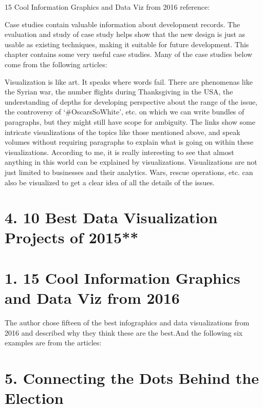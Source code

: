 \documentclass[]{book}
\theoremstyle{definition}
\theoremstyle{definition}
\theoremstyle{definition}
\theoremstyle{remark}
\begin{document}
15 Cool Information Graphics and Data Viz from 2016
reference:\citep{cool_data}

Case studies contain valuable information about development records. The
evaluation and study of case study helps show that the new design is
just as usable as existing techniques, making it suitable for future
development. This chapter contains some very useful case studies. Many
of the case studies below come from the following articles:

Visualization is like art. It speaks where words fail. There are
phenomenas like the Syrian war, the number flights during Thanksgiving
in the USA, the understanding of depths for developing perspective about
the range of the issue, the controversy of `\#OscarsSoWhite', etc. on
which we can write bundles of paragraphs, but they might still have
scope for ambiguity. The links show some intricate visualizations of the
topics like those mentioned above, and speak volumes without requiring
paragraphs to explain what is going on within these visualizations.
According to me, it is really interesting to see that almost anything in
this world can be explained by visualizations. Visualizations are not
just limited to businesses and their analytics. Wars, rescue operations,
etc. can also be visualized to get a clear idea of all the details of
the issues.

\section{\texorpdfstring{4. 10 Best Data Visualization Projects of
2015**
\citep{10_BEST}}{4. 10 Best Data Visualization Projects of 2015** {[}@10\_BEST{]}}}\label{best-data-visualization-projects-of-2015-10_best}

\section{\texorpdfstring{1. 15 Cool Information Graphics and Data Viz
from 2016
\citep{cool_data}}{1. 15 Cool Information Graphics and Data Viz from 2016 {[}@cool\_data{]}}}\label{cool-information-graphics-and-data-viz-from-2016-cool_data-1}

The author chose fifteen of the best infographics and data
visualizations from 2016 and described why they think these are the
best.And the following six examples are from the articles:

\section{5. Connecting the Dots Behind the
Election}\label{connecting-the-dots-behind-the-election}
\end{document}
